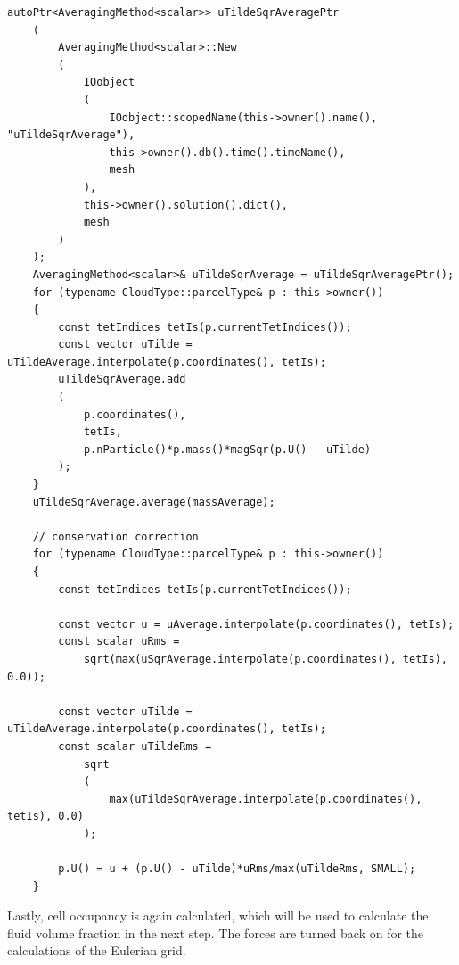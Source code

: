 \begin{lstlisting}[firstline=140]
    autoPtr<AveragingMethod<scalar>> uTildeSqrAveragePtr
    (
        AveragingMethod<scalar>::New
        (
            IOobject
            (
                IOobject::scopedName(this->owner().name(), "uTildeSqrAverage"),
                this->owner().db().time().timeName(),
                mesh
            ),
            this->owner().solution().dict(),
            mesh
        )
    );
    AveragingMethod<scalar>& uTildeSqrAverage = uTildeSqrAveragePtr();
    for (typename CloudType::parcelType& p : this->owner())
    {
        const tetIndices tetIs(p.currentTetIndices());
        const vector uTilde = uTildeAverage.interpolate(p.coordinates(), tetIs);
        uTildeSqrAverage.add
        (
            p.coordinates(),
            tetIs,
            p.nParticle()*p.mass()*magSqr(p.U() - uTilde)
        );
    }
    uTildeSqrAverage.average(massAverage);

    // conservation correction
    for (typename CloudType::parcelType& p : this->owner())
    {
        const tetIndices tetIs(p.currentTetIndices());

        const vector u = uAverage.interpolate(p.coordinates(), tetIs);
        const scalar uRms =
            sqrt(max(uSqrAverage.interpolate(p.coordinates(), tetIs), 0.0));

        const vector uTilde = uTildeAverage.interpolate(p.coordinates(), tetIs);
        const scalar uTildeRms =
            sqrt
            (
                max(uTildeSqrAverage.interpolate(p.coordinates(), tetIs), 0.0)
            );

        p.U() = u + (p.U() - uTilde)*uRms/max(uTildeRms, SMALL);
    }

\end{lstlisting}
\fi






Lastly, cell occupancy is again calculated, which will be used to calculate the fluid volume fraction in the next step.
The forces are turned back on for the calculations of the Eulerian grid.






